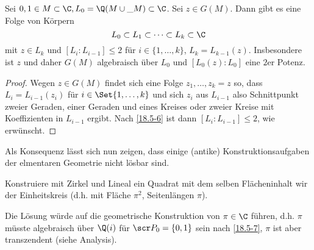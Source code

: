 \begin{kor} \label{18.5-7}
	Sei $0, 1 \in M \subset \C, L_0 = \Q(M \cup \_{M}) \subset \C$.
	Sei $z \in G(M)$.
	Dann gibt es eine Folge von Körpern
	\[
		L_0 \subset L_1 \subset \dotsb \subset L_k \subset \C
	\]
	mit $z \in L_k$ und $[L_i : L_{i-1}] \le 2$ für $i \in \{1, \dotsc, k\}$, $L_k = L_{k-1}(z)$.
	Insbesondere ist $z$ und daher $G(M)$ algebraisch über $L_0$ und $[L_0(z) : L_0]$ eine $2$er Potenz.
	\begin{proof}
		Wegen $z \in G(M)$ findet sich eine Folge $z_1, \dotsc, z_k = z$ so, dass $L_i = L_{i-1}(z_i)$ für $i \in \Set{1, \dotsc, k}$ und sich $z_i$ aus $L_{i-1}$ also Schnittpunkt zweier Geraden, einer Geraden und eines Kreises oder zweier Kreise mit Koeffizienten in $L_{i-1}$ ergibt.
		Nach \ref{18.5-6} ist dann $[L_i: L_{i-1}] \le 2$, wie erwünscht.
	\end{proof}
\end{kor}

Als Konsequenz lässt sich nun zeigen, dass einige (antike) Konstruktionsaufgaben der elmentaren Geometrie nicht lösbar sind.

\begin{ex} \label{18.5-8}
	Konstruiere mit Zirkel und Lineal ein Quadrat mit dem selben Flächeninhalt wir der Einheitskreis (d.h. mit Fläche $\pi^2$, Seitenlängen $\pi$).

	Die Lösung würde auf die geometrische Konstruktion von $\pi \in \C$ führen, d.h. $\pi$ müsste algebraisch über $\Q(i)$ für $\scr P_0 = \{0, 1\}$ sein nach \ref{18.5-7}, $\pi$ ist aber transzendent (siehe Analysis).
\end{ex}
